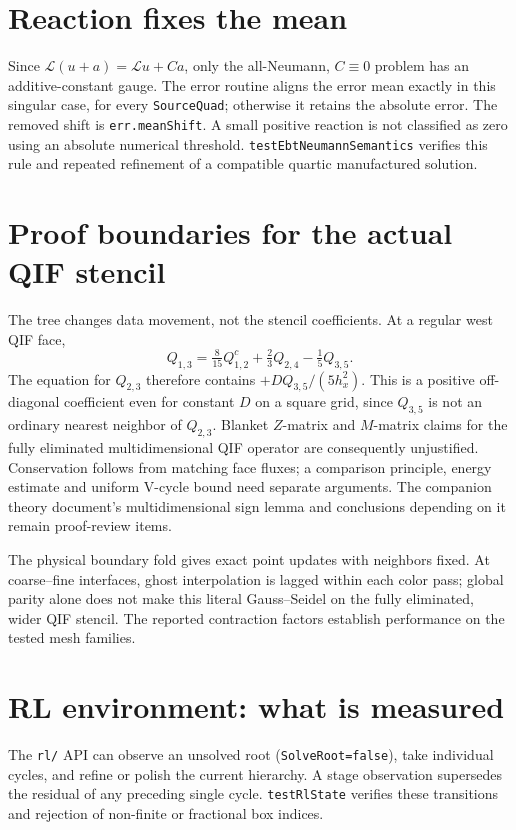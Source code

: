 \documentclass[11pt,oneside,openany]{book}
\newcommand{\code}[1]{\textnormal{\texttt{#1}}}
\begin{document}
\section{Reaction fixes the mean}
Since $\mathcal L(u+a)=\mathcal Lu+Ca$, only the all-Neumann,
$C\equiv0$ problem has an additive-constant gauge.  The error routine
aligns the error mean exactly in this singular case, for every
\code{SourceQuad}; otherwise it retains the absolute error.  The
removed shift is \code{err.meanShift}.  A small positive reaction is
not classified as zero using an absolute numerical threshold.
\code{testEbtNeumannSemantics} verifies this rule and repeated
refinement of a compatible quartic manufactured solution.

\section{Proof boundaries for the actual QIF stencil}
The tree changes data movement, not the stencil coefficients.  At a
regular west QIF face,
\[
 Q_{1,3}=\tfrac8{15}Q^c_{1,2}+\tfrac23Q_{2,4}-\tfrac15Q_{3,5}.
\]
The equation for $Q_{2,3}$ therefore contains
$+D Q_{3,5}/(5h_x^2)$.  This is a positive off-diagonal coefficient
even for constant $D$ on a square grid, since $Q_{3,5}$ is not an
ordinary nearest neighbor of $Q_{2,3}$.  Blanket $Z$-matrix and
$M$-matrix claims for the fully eliminated multidimensional QIF
operator are consequently unjustified.  Conservation follows from
matching face fluxes; a comparison principle, energy estimate and
uniform V-cycle bound need separate arguments.  The companion theory
document's multidimensional sign lemma and conclusions depending on
it remain proof-review items.

The physical boundary fold gives exact point updates with neighbors
fixed.  At coarse--fine interfaces, ghost interpolation is lagged
within each color pass; global parity alone does not make this literal
Gauss--Seidel on the fully eliminated, wider QIF stencil.  The reported
contraction factors establish performance on the tested mesh families.

\section{RL environment: what is measured}
The \code{rl/} API can observe an unsolved root
(\code{SolveRoot=false}), take individual cycles, and refine or polish
the current hierarchy.  A stage observation supersedes the residual
of any preceding single cycle.  \code{testRlState} verifies these
transitions and rejection of non-finite or fractional box indices.
\end{document}
